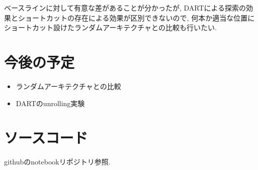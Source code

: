 \documentclass[twocolumn]{jarticle}     %
\begin{document}
ベースラインに対して有意な差があることが分かったが, DARTによる探索の効果とショートカットの存在による効果が区別できないので, 何本か適当な位置にショートカット設けたランダムアーキテクチャとの比較も行いたい.


\section{今後の予定}

\begin{itemize}
  \item ランダムアーキテクチャとの比較
  \item DARTのunrolling実験
\end{itemize}

\section{ソースコード}
githubのnotebookリポジトリ参照.



\end{document}
